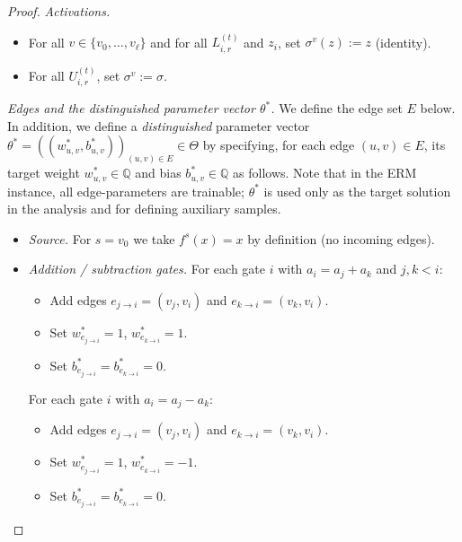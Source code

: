 \documentclass{article}
\newcommand{\Q}{\mathbb{Q}}
\theoremstyle{plain}
\theoremstyle{definition}
\theoremstyle{remark}
\begin{document}
\begin{proof}
	\smallskip
	\noindent
	\textit{Activations.}
	\begin{itemize}
		\item For all $v\in\{v_0,\dots,v_\ell\}$ and for all $L^{(t)}_{i,r}$
		and $z_i$, set $\sigma^v(z) := z$ (identity).
		\item For all $U^{(t)}_{i,r}$, set $\sigma^v := \sigma$.
	\end{itemize}
	
	\smallskip
	\noindent
	\textit{Edges and the distinguished parameter vector $\theta^\ast$.}
	We define the edge set $E$ below. In addition, we define a \emph{distinguished}
	parameter vector $\theta^\ast=((w^\ast_{u,v},b^\ast_{u,v}))_{(u,v)\in E}\in\Theta$
	by specifying, for each edge $(u,v)\in E$, its target weight $w^\ast_{u,v}\in\Q$
	and bias $b^\ast_{u,v}\in\Q$ as follows.
	Note that in the ERM instance, all edge-parameters are trainable; $\theta^\ast$ is
	used only as the target solution in the analysis and for defining auxiliary samples.
	
	\begin{itemize}
		\item \emph{Source.} For $s=v_0$ we take $f^s(x)=x$ by definition (no
		incoming edges).
		
		\item \emph{Addition / subtraction gates.}
		For each gate $i$ with $a_i = a_j + a_k$ and $j,k<i$:
		\begin{itemize}
			\item Add edges $e_{j\to i}=(v_j,v_i)$ and $e_{k\to i}=(v_k,v_i)$.
			\item Set $w^\ast_{e_{j\to i}}=1$, $w^\ast_{e_{k\to i}}=1$.
			\item Set $b^\ast_{e_{j\to i}}=b^\ast_{e_{k\to i}}=0$.
		\end{itemize}
		For each gate $i$ with $a_i = a_j - a_k$:
		\begin{itemize}
			\item Add edges $e_{j\to i}=(v_j,v_i)$ and $e_{k\to i}=(v_k,v_i)$.
			\item Set $w^\ast_{e_{j\to i}}=1$, $w^\ast_{e_{k\to i}}=-1$. 
			\item Set $b^\ast_{e_{j\to i}}=b^\ast_{e_{k\to i}}=0$.
		\end{itemize}
		

\end{itemize}
\end{proof}
\end{document}
